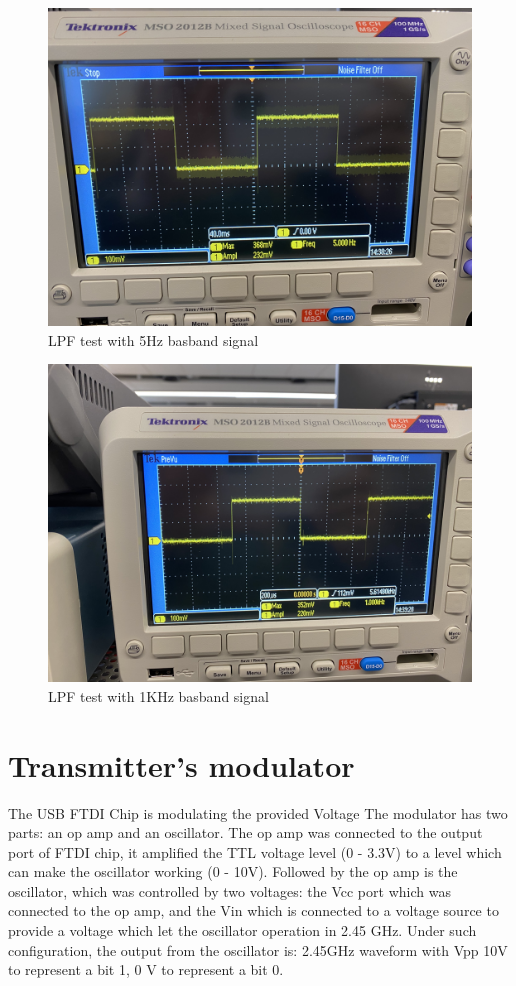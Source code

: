 \documentclass[12pt,a4paper]{report}
\begin{document}
\begin{figure}[H]
    \centerline{\includegraphics[scale=0.1]{LPFTest5Hz.PNG}}
    \caption{LPF test with 5Hz basband signal}
    \label{fig:LPF5}
\end{figure}

\begin{figure}[H]
    \centerline{\includegraphics[scale=0.1]{LPFTest1KHz.PNG}}
    \caption{LPF test with 1KHz basband signal}
    \label{fig:LPF1K}
\end{figure}
\chapter{Transmitter's modulator}
The USB FTDI Chip is modulating the provided Voltage
The modulator has two parts: an op amp and an oscillator. The op amp was connected to the output port of FTDI chip, it amplified the TTL voltage level (0 - 3.3V) to a level which can make the oscillator working (0 - 10V). Followed by the op amp is the oscillator, which was controlled by two voltages: the Vcc port which was connected to the op amp, and the Vin which is connected to a voltage source to provide a voltage which let the oscillator operation in 2.45 GHz.
Under such configuration, the output from the oscillator is: 2.45GHz waveform with Vpp 10V to represent a bit 1, 0 V to represent a bit 0.
\end{document}
